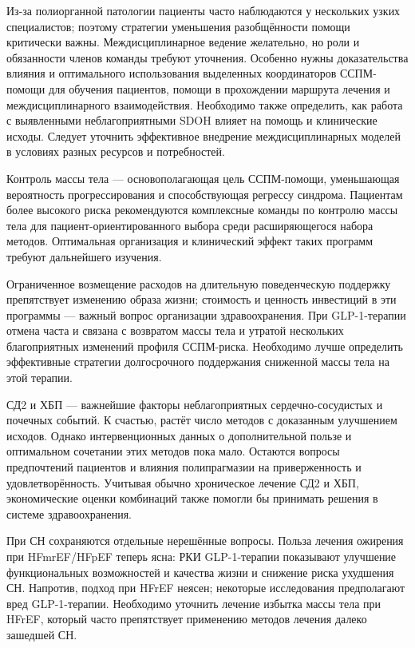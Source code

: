 \documentclass[11pt,a4paper]{article}
\begin{document}
Из-за полиорганной патологии пациенты часто наблюдаются у нескольких узких специалистов; поэтому стратегии уменьшения разобщённости помощи критически важны. Междисциплинарное ведение желательно, но роли и обязанности членов команды требуют уточнения. Особенно нужны доказательства влияния и оптимального использования выделенных координаторов ССПМ-помощи для обучения пациентов, помощи в прохождении маршрута лечения и междисциплинарного взаимодействия. Необходимо также определить, как работа с выявленными неблагоприятными SDOH влияет на помощь и клинические исходы. Следует уточнить эффективное внедрение междисциплинарных моделей в условиях разных ресурсов и потребностей.

Контроль массы тела --- основополагающая цель ССПМ-помощи, уменьшающая вероятность прогрессирования и способствующая регрессу синдрома. Пациентам более высокого риска рекомендуются комплексные команды по контролю массы тела для пациент-ориентированного выбора среди расширяющегося набора методов. Оптимальная организация и клинический эффект таких программ требуют дальнейшего изучения.

Ограниченное возмещение расходов на длительную поведенческую поддержку препятствует изменению образа жизни; стоимость и ценность инвестиций в эти программы --- важный вопрос организации здравоохранения. При GLP-1-терапии отмена часта и связана с возвратом массы тела и утратой нескольких благоприятных изменений профиля ССПМ-риска. Необходимо лучше определить эффективные стратегии долгосрочного поддержания сниженной массы тела на этой терапии.

СД2 и ХБП --- важнейшие факторы неблагоприятных сердечно-сосудистых и почечных событий. К счастью, растёт число методов с доказанным улучшением исходов. Однако интервенционных данных о дополнительной пользе и оптимальном сочетании этих методов пока мало. Остаются вопросы предпочтений пациентов и влияния полипрагмазии на приверженность и удовлетворённость. Учитывая обычно хроническое лечение СД2 и ХБП, экономические оценки комбинаций также помогли бы принимать решения в системе здравоохранения.

При СН сохраняются отдельные нерешённые вопросы. Польза лечения ожирения при HFmrEF/HFpEF теперь ясна: РКИ GLP-1-терапии показывают улучшение функциональных возможностей и качества жизни и снижение риска ухудшения СН. Напротив, подход при HFrEF неясен; некоторые исследования предполагают вред GLP-1-терапии. Необходимо уточнить лечение избытка массы тела при HFrEF, который часто препятствует применению методов лечения далеко зашедшей СН.
\end{document}
